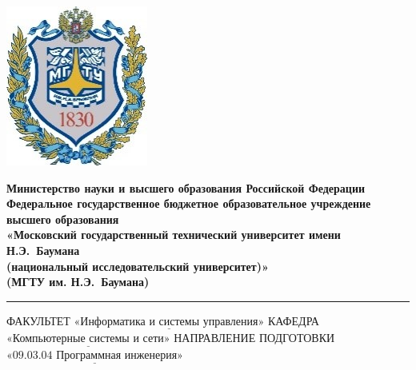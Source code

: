 \documentclass[a4paper,12pt]{article}
\begin{document}
\thispagestyle{empty}

\noindent \begin{minipage}{0.15\textwidth}
	\includegraphics[width=\linewidth]{b_logo}
\end{minipage}
\noindent\begin{minipage}{0.9\textwidth}\centering
	\textbf{Министерство науки и высшего образования Российской Федерации}\\
	\textbf{Федеральное государственное бюджетное образовательное учреждение высшего образования}\\
	\textbf{«Московский государственный технический университет имени Н.Э.~Баумана}\\
	\textbf{(национальный исследовательский университет)»}\\
	\textbf{(МГТУ им. Н.Э.~Баумана)}
\end{minipage}

\noindent\rule{18cm}{3pt}
\newline\newline
\noindent ФАКУЛЬТЕТ $\underline{\text{«Информатика и системы управления»}}$ \newline\newline
\noindent КАФЕДРА $\underline{\text{«Компьютерные системы и сети»}}$\newline\newline
\noindent НАПРАВЛЕНИЕ ПОДГОТОВКИ $\underline{\text{«09.03.04 Программная инженерия»}}$\newline\newline\newline\newline\newline
\end{document}

